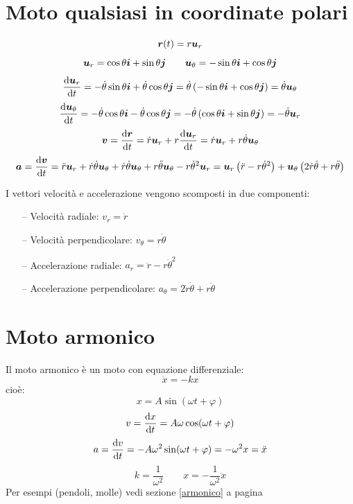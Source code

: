 \section{Moto qualsiasi in coordinate polari}
\begin{equation*}\boldsymbol{r}(t)=r\boldsymbol{u}_r\end{equation*}
\begin{equation*}\boldsymbol{u}_r=\cos\theta\boldsymbol{i}+\sin\theta\boldsymbol{j}\qquad \boldsymbol{u}_\theta=-\sin\theta\boldsymbol{i}+\cos\theta\boldsymbol{j}\end{equation*}
$$\frac{\mathrm{d}\boldsymbol{u}_r}{\mathrm{d} t}=-\dot\theta\sin\theta\boldsymbol{i}+\dot\theta\cos\theta\boldsymbol{j}=\dot\theta\left(-\sin\theta\boldsymbol{i}+\cos\theta\boldsymbol{j}\right)=\dot\theta\boldsymbol{u}_\theta$$
$$\frac{\mathrm{d}\boldsymbol{u}_\theta}{\mathrm{d} t}=-\dot\theta\cos\theta\boldsymbol{i}-\dot\theta\cos\theta\boldsymbol{j}=-\dot\theta\left(\cos\theta\boldsymbol{i}+\sin\theta\boldsymbol{j}\right)=-\dot\theta\boldsymbol{u}_r$$
$$\boldsymbol{v}=\frac{\mathrm{d}\boldsymbol{r}}{\mathrm{d} t}=\dot r\boldsymbol{u}_r+r\frac{\mathrm{d}\boldsymbol{u}_r}{\mathrm{d} t}=\dot r\boldsymbol{u}_r+r\dot\theta\boldsymbol{u}_\theta$$
$$\boldsymbol{a}=\frac{\mathrm{d}\boldsymbol{v}}{\mathrm{d} t}=\ddot r\boldsymbol{u}_r+\dot
r\dot\theta\boldsymbol{u}_\theta+\dot r\dot\theta\boldsymbol{u}_\theta+r\ddot\theta\boldsymbol{u}_\theta-r\dot\theta^2\boldsymbol{u}_r=\boldsymbol{u}_r\left(\ddot r-r\dot\theta^2\right)+\boldsymbol{u}_\theta\left(2\dot
r\dot\theta+r\ddot\theta\right)$$

 I vettori velocità e accelerazione vengono scomposti in due
componenti:
\begin{enumerate}
\item[--] Velocità radiale: $v_r=\dot r$
\item[--] Velocità perpendicolare: $v_\theta=r\dot\theta$
\item[--] Accelerazione radiale: $a_r=\ddot r-r\dot\theta^2$
\item[--] Accelerazione perpendicolare: $a_\theta=2\dot r\dot\theta+r\ddot
\theta$
\end{enumerate}
\section{Moto armonico}
Il moto armonico è un moto con equazione differenziale:
\begin{equation*}\ddot x=-k x\end{equation*}
cioè:
\begin{equation*}x=A\sin(\omega t+\varphi)\end{equation*}
\begin{equation*}v=\frac{\mathrm{d} x}{\mathrm{d} t}=A\omega\cos(\omega t+\varphi)\end{equation*}
\begin{equation*}a=\frac{\mathrm{d} v}{\mathrm{d} t}=-A\omega^2\sin(\omega t+\varphi)=-\omega^2 x=\ddot x\end{equation*}
\begin{equation*}k=\frac{1}{\omega^2}\qquad x=-\frac{1}{\omega^2}\ddot x\end{equation*}
 Per esempi (pendoli, molle) vedi sezione \ref{armonico} a
pagina \pageref{armonico}
